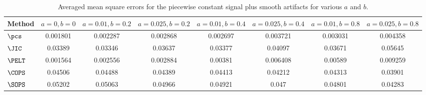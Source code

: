 \begin{table}[ht]
\centering
\begin{tabular}{lccccccc}
  \hline
Method & $a = 0, b = 0$ & $a = 0.01, b = 0.2$ & $a = 0.025, b = 0.2$ & $a = 0.01, b = 0.4$ & $a = 0.025, b = 0.4$ & $a = 0.01, b = 0.8$ & $a = 0.025, b = 0.8$ \\ 
  \hline
$\pcs$ & 0.001801 & 0.002287 & 0.002868 & 0.002697 & 0.003721 & 0.003031 & 0.004358 \\ 
  $\JIC$ & 0.03389 & 0.03346 & 0.03637 & 0.03377 & 0.04097 & 0.03671 & 0.05645 \\ 
  $\PELT$ & 0.001564 & 0.002556 & 0.002884 & 0.00381 & 0.006408 & 0.00589 & 0.009259 \\ 
  $\COPS$ & 0.04506 & 0.04488 & 0.04389 & 0.04413 & 0.04212 & 0.04313 & 0.03901 \\ 
  $\SOPS$ & 0.05202 & 0.05063 & 0.04966 & 0.04921 & 0.047 & 0.04801 & 0.04283 \\ 
   \hline
\end{tabular}
\caption{Averaged mean square errors for the piecewise constant signal plus smooth artifacts for various $a$ and $b$.} 
\label{tab:aMSEcp}
\end{table}
